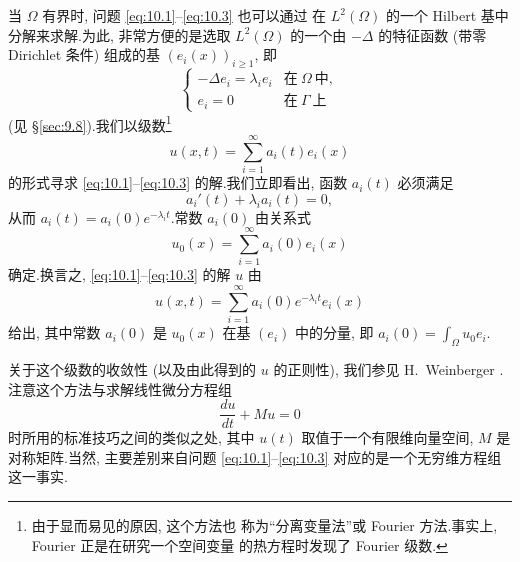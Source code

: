 \begin{remark}
\label{rem:10.3}
当 $\Omega$ 有界时, 问题 \eqref{eq:10.1}--\eqref{eq:10.3} 也可以通过
在 $L^2(\Omega)$ 的一个 Hilbert 基中分解来求解.为此, 非常方便的是选取
$L^2(\Omega)$ 的一个由 $-\Delta$ 的特征函数 (带零 Dirichlet 条件) 组成的基
$(e_i(x))_{i\ge1}$, 即
\begin{equation*}
\begin{cases}
-\Delta e_i=\lambda_ie_i & \text{在}\ \Omega\ \text{中},\\
e_i=0 & \text{在}\ \Gamma\ \text{上}
\end{cases}
\end{equation*}
(见 \S \ref{sec:9.8}).我们以级数\footnote{由于显而易见的原因, 这个方法也
称为``分离变量法''或 Fourier 方法.事实上, Fourier 正是在研究一个空间变量
的热方程时发现了 Fourier 级数.}
\begin{equation}
u(x,t)=\sum_{i=1}^\infty a_i(t)e_i(x)
\label{eq:10.12}
\end{equation}
的形式寻求 \eqref{eq:10.1}--\eqref{eq:10.3} 的解.我们立即看出, 函数
$a_i(t)$ 必须满足
\begin{equation*}
a_i'(t)+\lambda_ia_i(t)=0,
\end{equation*}
从而 $a_i(t)=a_i(0)e^{-\lambda_it}$.常数 $a_i(0)$ 由关系式
\begin{equation}
u_0(x)=\sum_{i=1}^\infty a_i(0)e_i(x)
\label{eq:10.13}
\end{equation}
确定.换言之, \eqref{eq:10.1}--\eqref{eq:10.3} 的解 $u$ 由
\begin{equation}
u(x,t)=\sum_{i=1}^\infty a_i(0)e^{-\lambda_it}e_i(x)
\label{eq:10.14}
\end{equation}
给出, 其中常数 $a_i(0)$ 是 $u_0(x)$ 在基 $(e_i)$ 中的分量, 即
$a_i(0)=\int_\Omega u_0e_i$.

关于这个级数的收敛性 (以及由此得到的 $u$ 的正则性), 我们参见
H.~Weinberger .注意这个方法与求解线性微分方程组
\begin{equation*}
\frac{du}{dt}+Mu=0
\end{equation*}
时所用的标准技巧之间的类似之处, 其中 $u(t)$ 取值于一个有限维向量空间,
$M$ 是对称矩阵.当然, 主要差别来自问题 \eqref{eq:10.1}--\eqref{eq:10.3}
对应的是一个无穷维方程组这一事实.
\end{remark}

